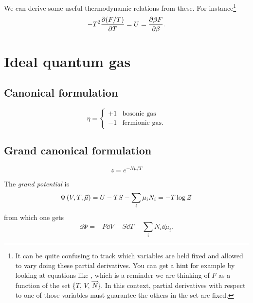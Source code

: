 We can derive some useful thermodynamic relations from these. For
instance\footnote{It can be quite confusing to track which variables
are held fixed and allowed to vary doing these partial derivatives.
You can get a hint for example by looking at equations like
, which is a reminder we are thinking of
$F$ as a function of the set \{$T$, $V$, $\vec{N}$\}. In this context,
partial derivatives with respect to one of those variables must
guarantee the others in the set are fixed.}
\begin{equation}\label{eq:dfdt}
  -T^2\pder[(F/T)]{T}=U=\pder[\beta F]{\beta}.
\end{equation}


\section{Ideal quantum gas}

\subsection{Canonical formulation}

\begin{equation}
\eta=
  \begin{cases}
     +1 & \text{bosonic gas} \\
     -1 & \text{fermionic gas}.
  \end{cases}
\end{equation}

\subsection{Grand canonical formulation}

\begin{equation}
  z=e^{-N\mu/T}
\end{equation}

The {\it grand potential} is
\begin{equation}
  \Phi\left(V,T,\vec{\mu}\right)=U-TS-\sum_i\mu_i N_i=-T\log\grandZ
\end{equation}
from which one gets
\begin{equation}
  \dd\Phi=-P\dd V-S\dd T-\sum_i N_i\dd\mu_i.
\end{equation}


